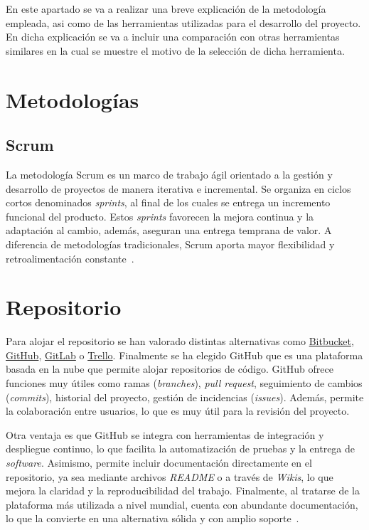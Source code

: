 En este apartado se va a realizar una breve explicación de la metodología empleada, asi como de las herramientas utilizadas para el desarrollo del proyecto. En dicha explicación se va a incluir una comparación con otras herramientas similares en la cual se muestre el motivo de la selección de dicha herramienta. 
\section{Metodologías}

\subsection{Scrum}
La metodología Scrum es un marco de trabajo ágil orientado a la gestión y desarrollo de proyectos de manera iterativa e incremental. Se organiza en ciclos cortos denominados \textit{sprints}, al final de los cuales se entrega un incremento funcional del producto. Estos \textit{sprints} favorecen la mejora continua y la adaptación al cambio, además, aseguran una entrega temprana de valor. A diferencia de metodologías tradicionales, Scrum aporta mayor flexibilidad y retroalimentación constante~\cite{scrum:guide}. 

\section{Repositorio}
Para alojar el repositorio se han valorado distintas alternativas como \href{https://bitbucket.org/}{Bitbucket}, \href{https://github.com/}{GitHub}, \href{https://gitlab.com/}{GitLab} o \href{https://trello.com/}{Trello}. Finalmente se ha elegido GitHub que es una plataforma basada en la nube que permite alojar repositorios de código. GitHub ofrece funciones muy útiles como ramas (\textit{branches}), \textit{pull request}, seguimiento de cambios (\textit{commits}), historial del proyecto, gestión de incidencias (\textit{issues}). Además, permite la colaboración entre usuarios, lo que es muy útil para la revisión del proyecto.

Otra ventaja es que GitHub se integra con herramientas de integración y despliegue continuo, lo que facilita la automatización de pruebas y la entrega de \textit{software}. Asimismo, permite incluir documentación directamente en el repositorio, ya sea mediante archivos \textit{README} o a través de \textit{Wikis}, lo que mejora la claridad y la reproducibilidad del trabajo. Finalmente, al tratarse de la plataforma más utilizada a nivel mundial, cuenta con abundante documentación, lo que la convierte en una alternativa sólida y con amplio soporte~\cite{gitHub}.

